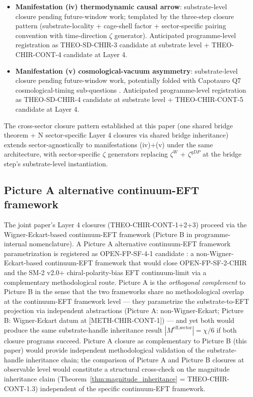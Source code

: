 \documentclass[11pt,letterpaper]{article}
\newcommand{\methref}[1]{\textsf{\small[\textsc{#1}]}}
\begin{document}
\begin{itemize}[leftmargin=*]
\item \textbf{Manifestation (iv) thermodynamic causal arrow}: substrate-level closure pending future-window work; templated by the three-step closure pattern (substrate-locality + cage-shell factor + sector-specific pairing convention with time-direction $\zeta$ generator). Anticipated programme-level registration as THEO-SD-CHIR-3 candidate at substrate level + THEO-CHIR-CONT-4 candidate at Layer 4.

\item \textbf{Manifestation (v) cosmological-vacuum asymmetry}: substrate-level closure pending future-window work, potentially folded with Capotauro Q7 cosmological-timing sub-questions \cite{Capotauro}. Anticipated programme-level registration as THEO-SD-CHIR-4 candidate at substrate level + THEO-CHIR-CONT-5 candidate at Layer 4.
\end{itemize}

The cross-sector closure pattern established at this paper (one shared bridge theorem + N sector-specific Layer 4 closures via shared bridge inheritance) extends sector-agnostically to manifestations (iv)+(v) under the same architecture, with sector-specific $\zeta$ generators replacing $\zeta^W$ + $\zeta^{qDP}$ at the bridge step's substrate-level instantiation.

\subsection{Picture A alternative continuum-EFT framework}
\label{sec:picture_a_alternative}

The joint paper's Layer 4 closures (THEO-CHIR-CONT-1+2+3) proceed via the Wigner-Eckart-based continuum-EFT framework (Picture B in programme-internal nomenclature). A Picture A alternative continuum-EFT framework parametrization is registered as OPEN-FP-SF-4-1 candidate \cite{ResearchFrontier}: a non-Wigner-Eckart-based continuum-EFT framework that would close OPEN-FP-SF-2-CHIR and the SM-2 v2.0+ chiral-polarity-bias EFT continuum-limit via a complementary methodological route. Picture A is the \emph{orthogonal complement} to Picture B in the sense that the two frameworks share no methodological overlap at the continuum-EFT framework level — they parametrize the substrate-to-EFT projection via independent abstractions (Picture A: non-Wigner-Eckart; Picture B: Wigner-Eckart datum at \methref{METH-CHIR-CONT-1}) — and yet both would produce the same substrate-handle inheritance result $|M^{\text{eff,sector}}| = \chi/6$ if both closure programs succeed. Picture A closure as complementary to Picture B (this paper) would provide independent methodological validation of the substrate-handle inheritance chain; the comparison of Picture A and Picture B closures at observable level would constitute a structural cross-check on the magnitude inheritance claim (Theorem~\ref{thm:magnitude_inheritance} = THEO-CHIR-CONT-1.3) independent of the specific continuum-EFT framework.
\end{document}
